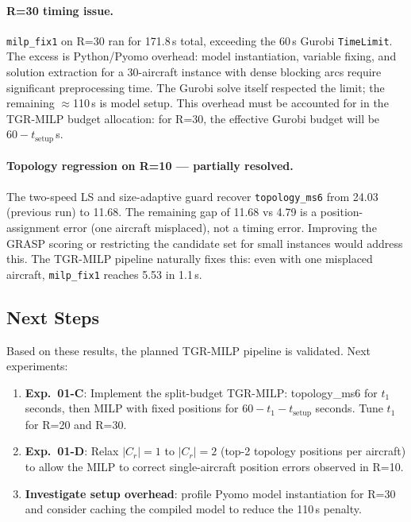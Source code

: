 \paragraph{R=30 timing issue.}

\texttt{milp\_fix1} on R=30 ran for 171.8\,s total, exceeding the 60\,s Gurobi
\texttt{TimeLimit}.  The excess is Python/Pyomo overhead: model instantiation,
variable fixing, and solution extraction for a 30-aircraft instance with dense
blocking arcs require significant preprocessing time.  The Gurobi solve itself
respected the limit; the remaining $\approx$110\,s is model setup.
This overhead must be accounted for in the TGR-MILP budget allocation:
for R=30, the effective Gurobi budget will be $60 - t_{\text{setup}}$\,s.

\paragraph{Topology regression on R=10 — partially resolved.}

The two-speed LS and size-adaptive guard recover \texttt{topology\_ms6} from
24.03 (previous run) to 11.68.  The remaining gap of 11.68 vs 4.79 is a
position-assignment error (one aircraft misplaced), not a timing error.
Improving the GRASP scoring or restricting the candidate set for small
instances would address this.  The TGR-MILP pipeline naturally fixes this:
even with one misplaced aircraft, \texttt{milp\_fix1} reaches 5.53 in 1.1\,s.

\subsection{Next Steps}

Based on these results, the planned TGR-MILP pipeline is validated.  Next
experiments:

\begin{enumerate}[noitemsep]
    \item \textbf{Exp.~01-C}: Implement the split-budget TGR-MILP:
          topology\_ms6 for $t_1$ seconds, then MILP with fixed positions for
          $60 - t_1 - t_{\text{setup}}$ seconds.  Tune $t_1$ for R=20 and R=30.
    \item \textbf{Exp.~01-D}: Relax $|C_r|=1$ to $|C_r|=2$ (top-2 topology
          positions per aircraft) to allow the MILP to correct single-aircraft
          position errors observed in R=10.
    \item \textbf{Investigate setup overhead}: profile Pyomo model instantiation
          for R=30 and consider caching the compiled model to reduce the 110\,s penalty.
\end{enumerate}
